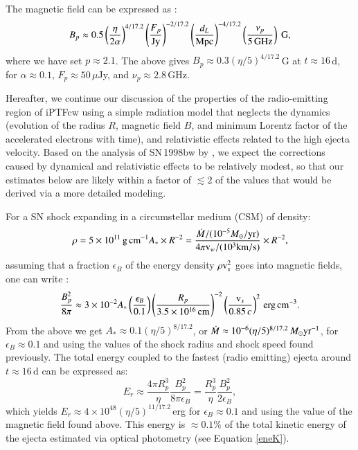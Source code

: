 \documentclass[twocolumn]{emulateapj}
\begin{document}
The magnetic field can be expressed as \citep[see Eq. (12) in][]{Chevalier1998}:
\begin{equation}
B_p\approx 0.5 \left(\frac{\eta}{2\alpha}\right)^{4/17.2}\left(\frac{F_{p}}{\rm Jy}\right)^{-2/17.2}\left(\frac{d_{L}}{\rm Mpc}\right)^{-4/17.2}\left(\frac{\nu_p}{5\,\rm GHz}\right){~\rm G},
\label{eq2}
\end{equation}
where we have set $p\approx 2.1$. The above gives $B_p\approx 0.3(\eta/5)^{4/17.2}$\,G at $t\approx 16$\,d, for $\alpha \approx 0.1$, $F_p\approx 50\,\mu$Jy, and $\nu_{p}\approx 2.8$\,GHz.

Hereafter, we continue our discussion of the properties of the radio-emitting region of iPTFcw using a simple radiation model that neglects the dynamics (evolution of the radius $R$, magnetic field $B$, and minimum Lorentz factor of the accelerated electrons with time), and relativistic effects related to the high ejecta velocity. Based on the analysis of SN\,1998bw by \citet{Li1999}, we expect  the corrections caused by dynamical and relativistic effects to be relatively modest, so that our estimates below are likely within a factor of $\lesssim 2$ of the values that would be derived via a more detailed modeling.

For a SN shock expanding in a circumstellar medium (CSM) of density:
\begin{equation}
\rho=5 \times10^{11} \,{\rm g\,cm}^{-1}A_{*}\times R^{-2}=\frac{\dot{M}/(10^{-5}M_{\odot}/{\rm yr})}{4\pi {\rm v}_w/(10^3{\rm km/s})}\times R^{-2},
\end{equation}
assuming that a fraction $\epsilon_B$ of the energy density $\rho{\rm v}^2_s$  goes into magnetic fields, one can write \citep[see Equation (8) in][]{Chevalier2006}:
\begin{equation}
 \frac{B_p^2}{8\pi}\approx 3\times10^{-2}A_* \left(\frac{\epsilon_B}{0.1}\right)\left(\frac{R_p}{3.5\times 10^{16}\,\rm cm}\right)^{-2}\left(\frac{{\rm v}_s}{0.85\,c}\right)^2\,{\rm erg\,cm^{-3}}.
\label{eq1}
\end{equation}
From the above we get $A_*\approx0.1  (\eta/5)^{8/17.2}$, or $\dot{M}\approx 10^{-6}(\eta/5)^{8/17.2}\,M_{\odot}{\rm yr}^{-1}$, for $\epsilon_B\approx 0.1$ and using the values of the shock radius and shock speed found previously. The total energy coupled to the fastest (radio emitting) ejecta around $t\approx 16$\,d can be expressed as:
\begin{equation}
E_r\approx \frac{4\pi R_p^3}{\eta}\frac{B_p^2}{8\pi\epsilon_B}=\frac{R_p^3}{\eta}\frac{B_p^2}{2\epsilon_B},
\label{eq3}
\end{equation}
which yields $E_r\approx 4\times10^{48}(\eta/5)^{11/17.2}$\,erg for $\epsilon_B\approx 0.1$ and using the value of the magnetic field found above. This energy is $\approx 0.1\%$ of the total kinetic energy of the ejecta estimated via optical photometry (see Equation \ref{eneK}). 
\end{document}
